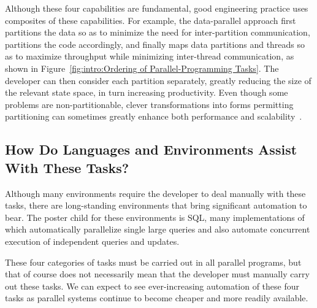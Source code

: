 Although these four capabilities are fundamental,
good engineering practice uses composites of
these capabilities.
For example, the data-parallel approach first
partitions the data so as to minimize the need for
inter-partition communication, partitions the code accordingly,
and finally maps data partitions and threads so as to maximize
throughput while minimizing inter-thread communication,
as shown in
Figure~\ref{fig:intro:Ordering of Parallel-Programming Tasks}.
The developer can then
consider each partition separately, greatly reducing the size
of the relevant state space, in turn increasing productivity.
Even though some problems are non-partitionable,
clever transformations into forms permitting partitioning can
sometimes greatly enhance
both performance and scalability~\cite{PanagiotisMetaxas1999PDCS}.

\subsection{How Do Languages and Environments Assist With These Tasks?}
\label{sec:intro:How Do Languages and Environments Assist With These Tasks?}

Although many environments require the developer to deal manually
with these tasks, there are long-standing environments that bring
significant automation to bear.
The poster child for these environments is SQL, many implementations
of which automatically parallelize single large queries and also
automate concurrent execution of independent queries and updates.

These four categories of tasks must be carried out in all parallel
programs, but that of course does not necessarily mean that the developer
must manually carry out these tasks.
We can expect to see ever-increasing automation of these four tasks
as parallel systems continue to become cheaper and more readily available.

